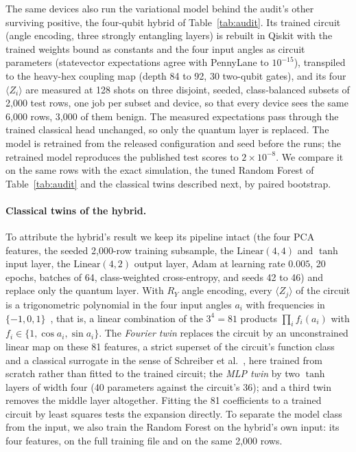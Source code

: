 \documentclass[preprint,11pt]{elsarticle}
\begin{document}
The same devices also run the variational model behind the audit's other surviving positive, the
four-qubit hybrid of Table~\ref{tab:audit}. Its trained circuit (angle encoding, three strongly
entangling layers) is rebuilt in Qiskit with the trained weights bound as constants and the four input
angles as circuit parameters (statevector expectations agree with PennyLane to $10^{-15}$), transpiled to
the heavy-hex coupling map (depth 84 to 92, 30 two-qubit gates), and its four $\langle Z_i\rangle$ are
measured at 128 shots on three disjoint, seeded, class-balanced subsets of 2{,}000 test rows, one job per
subset and device, so that every device sees the same 6{,}000 rows, 3{,}000 of them benign. The measured
expectations pass through the trained classical head unchanged, so only the quantum layer is replaced.
The model is retrained from the released configuration and seed before the runs; the retrained model
reproduces the published test scores to $2\times10^{-8}$. We compare it on the same rows with the exact
simulation, the tuned Random Forest of Table~\ref{tab:audit} and the classical twins described next, by
paired bootstrap.

\paragraph{Classical twins of the hybrid.} To attribute the hybrid's result we keep its pipeline intact
(the four PCA features, the seeded 2{,}000-row training subsample, the $\mathrm{Linear}(4,4)$ and $\tanh$
input layer, the $\mathrm{Linear}(4,2)$ output layer, Adam at learning rate $0.005$, 20 epochs, batches
of 64, class-weighted cross-entropy, and seeds 42 to 46) and replace only the quantum layer. With $R_Y$
angle encoding, every $\langle Z_j\rangle$ of the circuit is a trigonometric polynomial in the four input
angles $a_i$ with frequencies in $\{-1,0,1\}$~\cite{schuld2021encoding}, that is, a linear combination of
the $3^4=81$ products $\prod_i f_i(a_i)$ with $f_i\in\{1,\cos a_i,\sin a_i\}$. The \emph{Fourier twin}
replaces the circuit by an unconstrained linear map on these 81 features, a strict superset of the
circuit's function class and a classical surrogate in the sense of Schreiber et
al.~\cite{schreiber2023surrogates}, here trained from scratch rather than fitted to the trained circuit; the \emph{MLP twin} by two $\tanh$ layers of width four (40 parameters against
the circuit's 36); and a third twin removes the middle layer altogether. Fitting the 81 coefficients to a
trained circuit by least squares tests the expansion directly. To separate the model class from the
input, we also train the Random Forest on the hybrid's own input: its four features, on the full
training file and on the same 2{,}000 rows.
\end{document}
